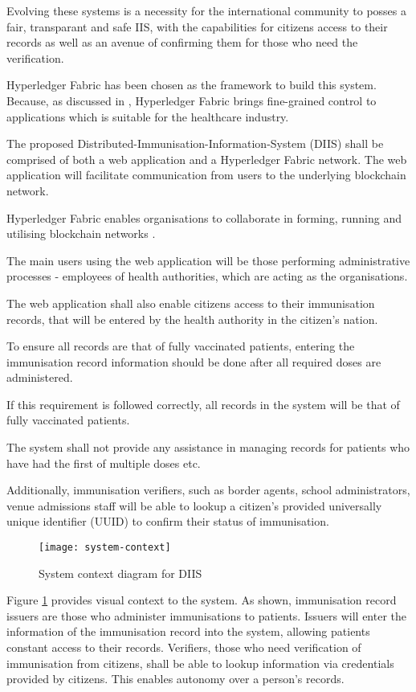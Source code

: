 Evolving these systems is a necessity for the international community to posses a fair, transparant and safe IIS, with the capabilities for citizens access to their records as well as an avenue of confirming them for those who need the verification.

Hyperledger Fabric has been chosen as the framework to build this system. 
Because, as discussed in \cite{yu_comparison_2020}, Hyperledger Fabric brings fine-grained control to applications which is suitable for the healthcare industry.

The proposed Distributed-Immunisation-Information-System (DIIS) shall be comprised of both a web application and a Hyperledger Fabric network. 
The web application will facilitate communication from users to the underlying blockchain network.

Hyperledger Fabric enables organisations to collaborate in forming, running and utilising blockchain networks \cite{noauthor_blockchain_nodate}.

The main users using the web application will be those performing administrative processes - employees of health authorities, which are acting as the organisations. 

The web application shall also enable citizens access to their immunisation records, that will be entered by the health authority in the citizen's nation.

To ensure all records are that of fully vaccinated patients, entering the immunisation record information should be done after all required doses are administered. 

If this requirement is followed correctly, all records in the system will be that of fully vaccinated patients. 

The system shall not provide any assistance in managing records for patients who have had the first of multiple doses etc.

Additionally, immunisation verifiers, such as border agents, school administrators, venue admissions staff will be able to lookup a citizen's provided universally unique identifier (UUID) to confirm their status of immunisation.

\begin{figure}[H]
    \texttt{[image: system-context]}
    \caption{System context diagram for DIIS}
    \label{fig:context}
  \end{figure}

Figure \ref{fig:context} provides visual context to the system. As shown, immunisation record issuers are those who administer immunisations to patients. 
Issuers will enter the information of the immunisation record into the system, allowing patients constant access to their records. 
Verifiers, those who need verification of immunisation from citizens, shall be able to lookup information via credentials provided by citizens. 
This enables autonomy over a person's records. 

